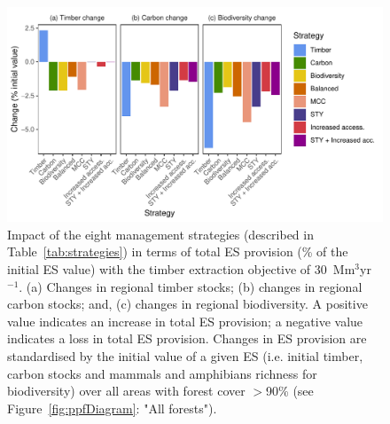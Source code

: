 \documentclass[12pt]{article}
\begin{document}
\begin{figure}
    \centering
    \includegraphics[width=\linewidth]{graphs/costsScenario}
    \caption{Impact of the eight management strategies (described in Table~\ref{tab:strategies}) in terms of total ES provision (\% of the initial ES value) with the timber extraction objective of 30~Mm$^3$yr$^{-1}$. (a) Changes in regional timber stocks; (b) changes in regional carbon stocks; and, (c) changes in regional biodiversity. A positive value indicates an increase in total ES provision; a negative value indicates a loss in total ES provision. Changes in ES provision are standardised by the initial value of a given ES (i.e. initial timber, carbon stocks and mammals and amphibians richness for biodiversity) over all areas with forest cover $>$90\% (see Figure~\ref{fig:ppfDiagram}: "All forests"). 
 }
    \label{fig:scenESProv}
\end{figure}
\end{document}
